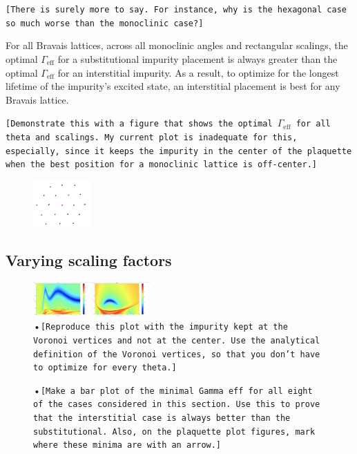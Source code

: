 \documentclass[aps,pra,superscriptaddress,twocolumn]{revtex4-1}
\newcommand{\commentSB}[1]{\texttt{\color{blue}[#1]}}
\newcommand{\commentTP}[1]{\texttt{\color{green}[#1]}}
\begin{document}
\commentSB{There is surely more to say. For instance, why is the hexagonal case so much worse than the monoclinic case?}

For all Bravais lattices, across all monoclinic angles and rectangular scalings, the optimal $\Gamma_\text{eff}$ for a substitutional impurity placement is always greater than the optimal $\Gamma_\text{eff}$ for an interstitial impurity. As a result, to optimize for the longest lifetime of the impurity's excited state, an interstitial placement is best for any Bravais lattice. 

\commentSB{Demonstrate this with a figure that shows the optimal $\Gamma_\text{eff}$ for all theta and scalings. My current plot is inadequate for this, especially, since it keeps the impurity in the center of the plaquette when the best position for a monoclinic lattice is off-center.} 

\begin{figure}
    \centering
    \includegraphics[width=0.2\textwidth]{figures/triangle_substitution_geometry.png}
    \label{fig:triangle_substitution_geometry}
\end{figure}

\subsection{Varying scaling factors}

\begin{figure}
    \centering
    \includegraphics[width=0.4\textwidth]{figures/mono_rect_thetadelta.png} 
    \caption{•\commentTP{Reproduce this plot with the impurity kept at the Voronoi vertices and not at the center. Use the analytical definition of the Voronoi vertices, so that you don't have to optimize for every theta.}}
    \label{fig:mono_rect_thetadelta}
\end{figure}

\begin{figure}
    \centering
    \caption{•\commentTP{Make a bar plot of the minimal Gamma eff for all eight of the cases considered in this section. Use this to prove that the interstitial case is always better than the substitutional. Also, on the plaquette plot figures, mark where these minima are with an arrow.}}
    \label{fig:mono_rect_thetadelta}
\end{figure}
\end{document}
